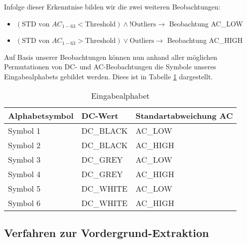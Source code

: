 Infolge dieser Erkenntnise bilden wir die zwei weiteren Beobachtungen:
\begin{itemize}
	\item $(\text{STD von }AC_{1-63} < \text{Threshold} ) \wedge !\text{Outliers} \rightarrow$  Beobachtung AC\_LOW
	\item $(\text{STD von }AC_{1-63} > \text{Threshold} ) \vee \text{Outliers} \rightarrow$  Beobachtung AC\_HIGH
\end{itemize}
Auf Basis unserer Beobachtungen können nun anhand aller möglichen Permutationen von DC- und AC-Beobachtungen die Symbole unseres Eingabealphabets gebildet werden. Diees ist in Tabelle \ref{table:eingabealphabet} dargestellt.
\begin{table}
	\label{table:eingabealphabet}
	\begin{center}
\begin{tabular}{|l|l|l|}
\hline
\textbf{Alphabetsymbol}&\textbf{DC-Wert}&\textbf{Standartabweichung AC}\\
\hline
Symbol 1&DC\_BLACK&AC\_LOW\\
\hline
Symbol 2&DC\_BLACK&AC\_HIGH\\
\hline
Symbol 3&DC\_GREY&AC\_LOW\\
\hline
Symbol 4&DC\_GREY&AC\_HIGH\\
\hline
Symbol 5&DC\_WHITE&AC\_LOW\\
\hline
Symbol 6&DC\_WHITE&AC\_HIGH\\
\hline
\end{tabular}
	\caption{Eingabealphabet}
\end{center}
\end{table}

\subsection{Verfahren zur Vordergrund-Extraktion}
\label{sec:verfahren}

